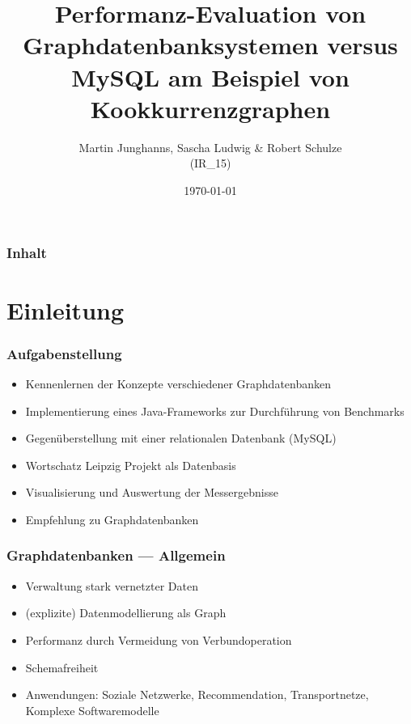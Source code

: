 \documentclass{beamer}
\begin{document}
\title{Performanz-Evaluation von Graphdatenbanksystemen versus MySQL am Beispiel von Kookkurrenzgraphen}
\author{Martin Junghanns, Sascha Ludwig \& Robert Schulze\\(IR\_{}15)} 
\date{\today}

\begin{frame}
	\titlepage
\end{frame}

\begin{frame}\frametitle{Inhalt}
	\tableofcontents
\end{frame}

\section{Einleitung}

\begin{frame}\frametitle{Aufgabenstellung}
	\begin{itemize}
		\item Kennenlernen der Konzepte verschiedener Graphdatenbanken
		\item Implementierung eines Java-Frameworks zur Durchführung von Benchmarks
		\item Gegenüberstellung mit einer relationalen Datenbank (MySQL)
		\item Wortschatz Leipzig Projekt als Datenbasis
		\item Visualisierung und Auswertung der Messergebnisse
		\item Empfehlung zu Graphdatenbanken
	\end{itemize} 
\end{frame}

\begin{frame}\frametitle{Graphdatenbanken --- Allgemein}
	\begin{itemize}
		\item Verwaltung stark vernetzter Daten
		\item (explizite) Datenmodellierung als Graph		
		\item Performanz durch Vermeidung von Verbundoperation
		\item Schemafreiheit
		\item Anwendungen: Soziale Netzwerke, Recommendation, Transportnetze, Komplexe Softwaremodelle
	\end{itemize} 
\end{frame}
\end{document}
